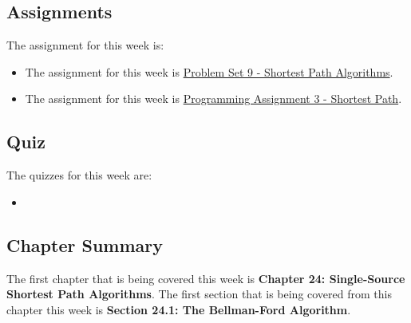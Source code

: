 \subsection{Assignments}

The assignment for this week is:

\begin{itemize}
    \item The assignment for this week is \href{https://github.com/QuantumCompiler/CU/tree/main/CSPB%203104%20-%20Algorithms/CSPB%203104%20-%20Assignments/CSPB%203104%20-%20Problem%20Sets/CSPB%203104%20-%20Problem%20Set%209%20-%20Shortest%20Path%20Algorithms}{Problem Set 9 - Shortest Path Algorithms}. 
    \item The assignment for this week is \href{https://github.com/QuantumCompiler/CU/tree/main/CSPB%203104%20-%20Algorithms/CSPB%203104%20-%20Assignments/CSPB%203104%20-%20Programming%20Assignments/CSPB%203104%20-%20Programming%20Assignment%203%20-%20Shortest%20Path}{Programming Assignment 3 - Shortest Path}. 
\end{itemize}

\subsection{Quiz}

The quizzes for this week are:

\begin{itemize}
    \item {} \textbullet {} 
\end{itemize}

\subsection{Chapter Summary}

The first chapter that is being covered this week is \textbf{Chapter 24: Single-Source Shortest Path Algorithms}. The first section that is being covered from this chapter this week is \textbf{Section 24.1: The Bellman-Ford Algorithm}.

